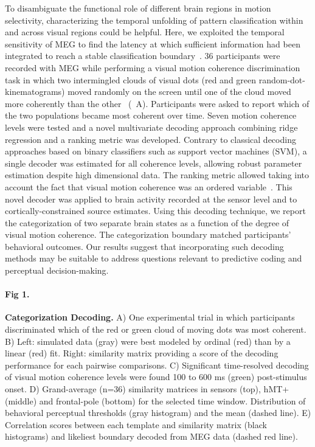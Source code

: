 To disambiguate the functional role of different brain regions in motion selectivity, characterizing the temporal unfolding of pattern classification within and across visual regions could be helpful. Here, we exploited the temporal sensitivity of MEG to find the latency at which sufficient information had been integrated to reach a stable classification boundary~\cite{20mitchell2008predicting,21ramkumar2013feature,22king2014characterizing}. 36 participants were recorded with MEG while performing a visual motion coherence discrimination task in which two intermingled clouds of visual dots (red and green random-dot-kinematograms) moved randomly on the screen until one of the cloud moved more coherently than the other~\cite{23zilber2014supramodal} (~A). Participants were asked to report which of the two populations became most coherent over time. Seven motion coherence levels were tested and a novel multivariate decoding approach combining ridge regression and a ranking metric was developed. Contrary to classical decoding approaches based on binary classifiers such as support vector machines (SVM), a single decoder was estimated for all coherence levels, allowing robust parameter estimation despite high dimensional data. The ranking metric allowed taking into account the fact that visual motion coherence was an ordered variable~\cite{herbrich00ordinal,Joachims:2002}. This novel decoder was applied to brain activity recorded at the sensor level and to cortically-constrained source estimates. Using this decoding technique, we report the categorization of two separate brain states as a function of the degree of visual motion coherence. The categorization boundary matched participants' behavioral outcomes. Our results suggest that incorporating such decoding methods may be suitable to address questions relevant to predictive coding and perceptual decision-making.

\paragraph*{Fig 1.} \label{fig:fig1}
{\bf Categorization Decoding.} A) One experimental trial in which participants discriminated  which of the red or green cloud of moving dots was most coherent. B) Left: simulated data (gray) were best modeled by ordinal (red) than by a linear (red) fit. Right: similarity matrix providing a score of the decoding performance for each pairwise comparisons. C) Significant time-resolved decoding of visual motion coherence levels were found 100 to 600 ms (green) post-stimulus onset. D) Grand-average (n=36) similarity matrices in sensors (top), hMT+ (middle) and frontal-pole (bottom) for the selected time window. Distribution of behavioral perceptual thresholds (gray histogram) and the mean (dashed line). E) Correlation scores between each template and similarity matrix (black histograms) and likeliest boundary decoded from MEG data (dashed red line).


